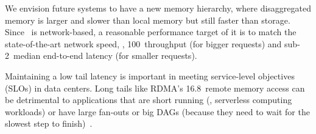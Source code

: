 We envision future systems to have a new memory hierarchy, where disaggregated memory is larger and slower than local memory but still faster than storage.
Since \md\ is network-based, a reasonable performance target of it is to match the state-of-the-art network speed,
\ie, 100\Gbps\ throughput (for bigger requests) and sub-2\mus\ median end-to-end latency (for smaller requests).
 
Maintaining a low tail latency is important in meeting service-level objectives (SLOs) in data centers.
Long tails like RDMA's 16.8\ms\ remote memory access can be detrimental to applications that are short running (\eg, serverless computing workloads) or have large fan-outs or big DAGs
(because they need to wait for the slowest step to finish)~\cite{taillatency}.

